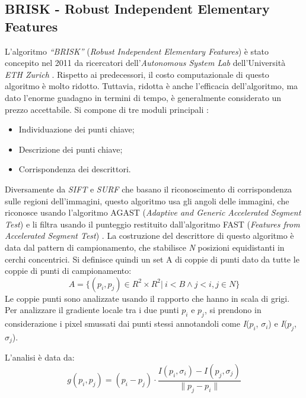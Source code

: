 \subsection{BRISK - Robust Independent Elementary Features}
L'algoritmo \textit{``BRISK''} (\textit{Robust Independent Elementary Features}) è stato concepito nel 2011 da ricercatori dell'\textit{Autonomous System Lab} dell'Università \textit{ETH Zurich} \cite{6126542}. Rispetto ai predecessori, il costo computazionale di questo algoritmo è molto ridotto. Tuttavia, ridotta è anche l'efficacia dell'algoritmo, ma dato l'enorme guadagno in termini di tempo, è generalmente considerato un prezzo accettabile.
\noindent Si compone di tre moduli principali \cite{Liu2018-ds}: 
\begin{itemize}
	\item Individuazione dei punti chiave;
	\item Descrizione dei punti chiave; 
	\item Corrispondenza dei descrittori.
\end{itemize}
\noindent Diversamente da \textit{SIFT} e \textit{SURF} che basano il riconoscimento di corrispondenza sulle regioni dell'immagini, questo algoritmo usa gli angoli delle immagini, che riconosce usando l'algoritmo AGAST (\textit{Adaptive and Generic Accelerated Segment Test}) \cite{10.1007/978-3-642-15552-9_14} e li filtra usando il punteggio restituito dall'algoritmo FAST (\textit{Features from Accelerated Segment Test}) \cite{Rosten2010-yf}. \hfill \break
\noindent La costruzione del descrittore di questo algoritmo è data dal pattern di campionamento, che stabilisce \textit{N} posizioni equidistanti in cerchi concentrici. Si definisce quindi un set A di coppie di punti dato da tutte le coppie di punti di campionamento:
\begin{equation}
	A = \{ (p_{i}, p_{j}) \in R^{2} \times R^{2} |\ i < B \wedge j < i, j \in \textit{N} \}
\end{equation}
\noindent Le coppie punti sono analizzate usando il rapporto che hanno in scala di grigi.
Per analizzare il gradiente locale tra i due punti \(p_{i}\) e \(p_{j}\), si prendono in considerazione i pixel smussati dai punti stessi annotandoli come \textit{I}(\(p_{i}\), \(\sigma_{i}\)) e \textit{I}(\(p_{j}\), \(\sigma_{j}\)). \par
\noindent L'analisi è data da:
\begin{equation}
	g(p_{i}, p_{j}) = (p_{i} - p_{j}) \cdot \frac{\textit{I}(p_{i}, \sigma_{i}) - \textit{I}(p_{j}, \sigma_{j})}{\|p_{j} - p_{i}\|}
\end{equation}

